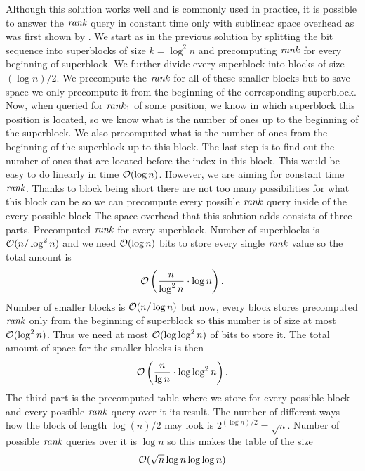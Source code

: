 Although this solution works well and is commonly used in practice, it is possible to
answer the $\mathit{rank}$ query in constant time only with sublinear space overhead as was first
shown by \cite{okanohara2007practical}. We start as in the previous solution by splitting
the bit sequence into superblocks of size $k=\log^2 n$ and precomputing $\mathit{rank}$ for every
beginning of superblock. We further divide every superblock into blocks of size $(\log n)/2$.
We precompute the $\mathit{rank}$ for all of these smaller blocks but to save space we only precompute
it from the beginning of the corresponding superblock. Now, when queried for $\mathit{rank}_1$
of some position, we know in which superblock this position is located, so we know what is the
number of ones up to the beginning of the superblock. We also
precomputed what is the number of ones from the beginning of the superblock up to this block.
The last step is to find out the number of ones that are located before the index in this
block. This would be easy to do linearly in time $\mathcal{O}(\log n)$. However, we are aiming for
constant time $\mathit{rank}$. Thanks to block being short there are not too many possibilities for what
this block can be so we can precompute every possible $\mathit{rank}$ query inside of the every possible
block The space overhead that this solution adds consists of three parts.
Precomputed $\mathit{rank}$ for every superblock. Number of superblocks is $\mathcal{O}(n/\log^2 n)$ and we
need $\mathcal{O}(\log n)$ bits to store every single $\mathit{rank}$ value so the total amount is
\begin{equation}
    \mathcal{O}\left(\frac{n}{\log^2 n}\cdot \log n\right).
    \label{eq:rank_space_1}
\end{equation}
Number of smaller blocks is $\mathcal{O}(n/\log n)$ but now, every block stores precomputed $\mathit{rank}$
only from the beginning of superblock so this number is of size at most $\mathcal{O}(\log^2 n)$. Thus
we need at most $\mathcal{O}(\log\log^2 n)$ of bits to store it. The total amount of space for the
smaller blocks is then
\begin{equation}
    \mathcal{O}\left(\frac{n}{\lg n}\cdot \log\log^2 n\right).
    \label{eq:rank_space_2}
\end{equation}
The third part is the precomputed table where we store for every possible block and every
possible $\mathit{rank}$ query over it its result. The number of different ways how the block of length
$\log(n)/2$ may look is $2^{(\log n)/2} = \sqrt{n}$. Number of possible $\mathit{rank}$
queries over it is $\log n$ so this makes the table of the size
\begin{equation}
    \mathcal{O}(\sqrt{n}\log n\log\log n)
    \label{eq:rank_space_3}
\end{equation}
